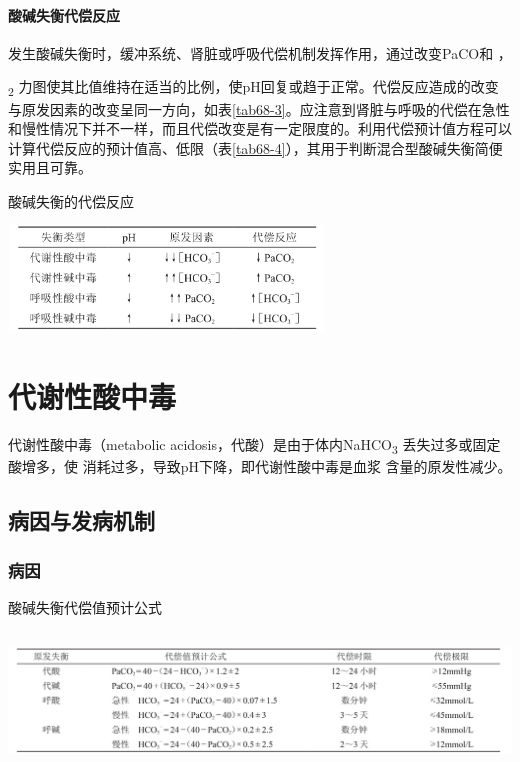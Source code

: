 \paragraph{酸碱失衡代偿反应}

发生酸碱失衡时，缓冲系统、肾脏或呼吸代偿机制发挥作用，通过改变PaCO和{}
，

\textsubscript{2}
力图使其比值维持在适当的比例，使pH回复或趋于正常。代偿反应造成的改变与原发因素的改变呈同一方向，如表\ref{tab68-3}。应注意到肾脏与呼吸的代偿在急性和慢性情况下并不一样，而且代偿改变是有一定限度的。利用代偿预计值方程可以计算代偿反应的预计值高、低限（表\ref{tab68-4}），其用于判断混合型酸碱失衡简便实用且可靠。

\begin{table}[htbp]
\centering
\caption{酸碱失衡的代偿反应}
\label{tab68-3}
\includegraphics[width=3.30208in,height=1.125in]{./images/Image00277.jpg}
\end{table}

\protect\hypertarget{text00204.html}{}{}

\section{代谢性酸中毒}

代谢性酸中毒（metabolic acidosis，代酸）是由于体内NaHCO\textsubscript{3}
丢失过多或固定酸增多，使{} 消耗过多，导致pH下降，即代谢性酸中毒是血浆{}
含量的原发性减少。

\subsection{病因与发病机制}

\subsubsection{病因}

\begin{table}[htbp]
\centering
\caption{酸碱失衡代偿值预计公式}
\label{tab68-4}
\includegraphics[width=6.72917in,height=1.4375in]{./images/Image00280.jpg}
\end{table}

